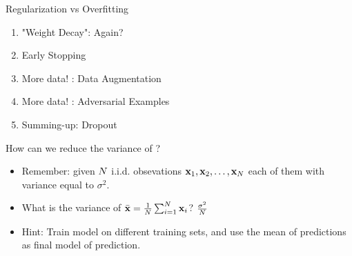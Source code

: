 \documentclass[xcolor=pdftex,dvipsnames,table,mathserif]{beamer}
\begin{document}
\begin{frame}{Regularization vs Overfitting}
\begin{enumerate}
\item "Weight Decay": Again?
\item Early Stopping
\item More data! : Data Augmentation
\item More data!  : Adversarial Examples
\item Summing-up: Dropout
\end{enumerate}
\end{frame}

\begin{frame}{How can we reduce the variance of ?}
\begin{itemize}
\item Remember: given $N$ i.i.d. obsevations $\mathbf{x}_1,\mathbf{x}_2,\ldots,\mathbf{x}_N$ each of them with variance equal to $\sigma^2$. 
\item What is the variance of $\bar{\mathbf{x}}=\frac{1}{N} \sum_{i=1}^{N} \mathbf{x}_i $? \pause $\frac{\sigma^2}{N}$
\item \alert{Hint}: Train model on different training sets, and use the mean of predictions as final model of prediction.
\end{itemize}
\end{frame}
\end{document}
